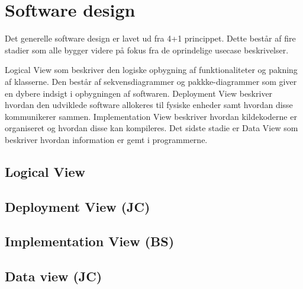 \chapter{Software design}
Det generelle software design er lavet ud fra 4+1 princippet. Dette består af fire stadier som alle bygger videre på fokus fra de oprindelige usecase beskrivelser.

Logical View som beskriver den logiske opbygning af funktionaliteter og pakning af klasserne. Den består af sekvensdiagrammer og pakkke-diagrammer som giver en dybere indsigt i opbygningen af softwaren.\newline
Deployment View beskriver hvordan den udviklede software allokeres til fysiske enheder samt hvordan disse kommunikerer sammen.\newline
Implementation View beskriver hvordan kildekoderne er organiseret og hvordan disse kan kompileres.\newline
Det sidste stadie er Data View som beskriver hvordan information er gemt i programmerne.

\section{Logical View}


\section{Deployment View (JC)}


\section{Implementation View (BS)}


\section{Data view (JC)}

